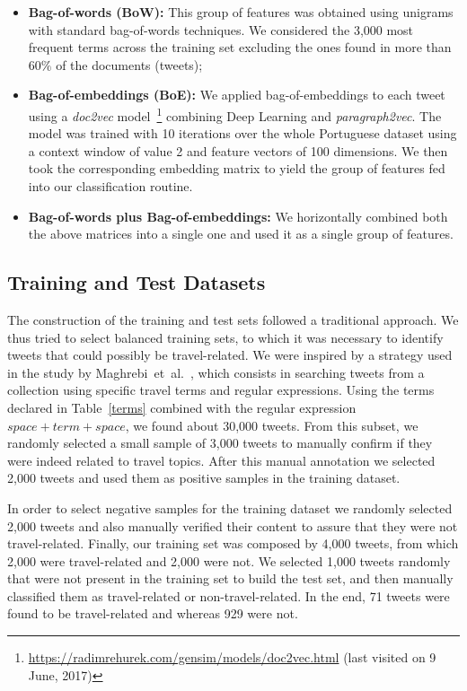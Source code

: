 \begin{itemize}
\item \textbf{Bag-of-words (BoW):} This group of features was obtained using unigrams with standard bag-of-words techniques. We considered the 3,000 most frequent terms across the training set excluding the ones found in more than 60$\%$ of the documents (tweets);

\item \textbf{Bag-of-embeddings (BoE):} We applied bag-of-embeddings to each tweet using a \textit{doc2vec} model~\footnote{\url{https://radimrehurek.com/gensim/models/doc2vec.html} (last visited on 9 June, 2017)} combining Deep Learning and \textit{paragraph2vec}. The model was trained with 10 iterations over the whole Portuguese dataset using a context window of value 2 and feature vectors of 100 dimensions. We then took the corresponding embedding matrix to yield the group of features fed into our classification routine. 

\item \textbf{Bag-of-words plus Bag-of-embeddings:} We horizontally combined both the above matrices into a single one and used it as a single group of features.
\end{itemize}

\subsection{Training and Test Datasets}
The construction of the training and test sets followed a traditional approach. We thus tried to select balanced training sets, to which it was necessary to identify tweets that could possibly be travel-related.
We were inspired by a strategy used in the study by Maghrebi~et~al.~\cite{maghrebi2016transportation}, which consists in searching tweets from a collection using specific travel terms and regular expressions. Using the terms declared in Table~\ref{terms} combined with the regular expression $space + term + space$, we found about 30,000 tweets. From this subset, we randomly selected a small sample of 3,000 tweets to manually confirm if they were indeed related to travel topics. After this manual annotation we selected 2,000 tweets and used them as positive samples in the training dataset.

In order to select negative samples for the training dataset we randomly selected 2,000 tweets and also manually verified their content to assure that they were not travel-related. Finally, our training set was composed by 4,000 tweets, from which 2,000 were travel-related and 2,000 were not. 
We selected 1,000 tweets randomly that were not present in the training set to build the test set, and then manually classified them as travel-related or non-travel-related. In the end, 71 tweets were found to be travel-related and whereas 929 were not.

